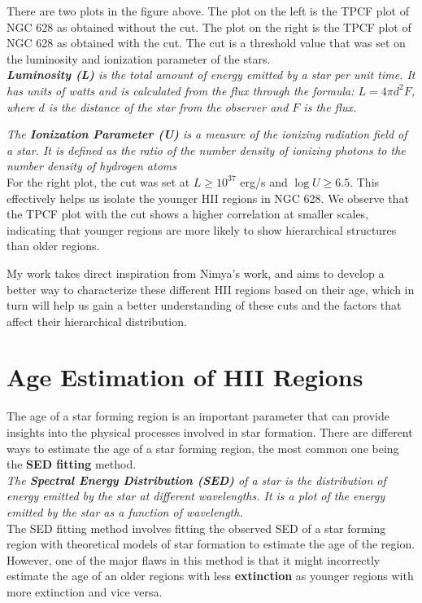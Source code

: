 \documentclass[12pt]{report}
\begin{document}
There are two plots in the figure above. The plot on the left is the TPCF plot of NGC 628 as obtained without the cut. The plot on the right is the TPCF plot of NGC 628 as obtained with the cut. The cut is a threshold value that was set on the luminosity and ionization parameter of the stars. \\

\textit{\textbf{Luminosity (L)} is the total amount of energy emitted by a star per unit time. It has units of watts and is calculated from the flux through the formula: $L = 4\pi d^2 F$, where $d$ is the distance of the star from the observer and $F$ is the flux.}

\textit{The \textbf{Ionization Parameter (U)} is a measure of the ionizing radiation field of a star. It is defined as the ratio of the number density of ionizing photons to the number density of hydrogen atoms} \\

For the right plot, the cut was set at $L \ge 10^{37}$ erg/s and $\log U \ge 6.5$. This effectively helps us isolate the younger HII regions in NGC 628. We observe that the TPCF plot with the cut shows a higher correlation at smaller scales, indicating that younger regions are more likely to show hierarchical structures than older regions. 

My work takes direct inspiration from Nimya's work, and aims to develop a better way to characterize these different HII regions based on their age, which in turn will help us gain a better understanding of these cuts and the factors that affect their hierarchical distribution. 

\section{Age Estimation of HII Regions}

The age of a star forming region is an important parameter that can provide insights into the physical processes involved in star formation. There are different ways to estimate the age of a star forming region, the most common one being the \textbf{SED fitting} method. \\

\textit{The \textbf{Spectral Energy Distribution (SED)} of a star is the distribution of energy emitted by the star at different wavelengths. It is a plot of the energy emitted by the star as a function of wavelength. }\\

The SED fitting method involves fitting the observed SED of a star forming region with theoretical models of star formation to estimate the age of the region. However, one of the major flaws in this method is that it might incorrectly estimate the age of an older regions with less \textbf{extinction} as younger regions with more extinction and vice versa.\\
\end{document}
